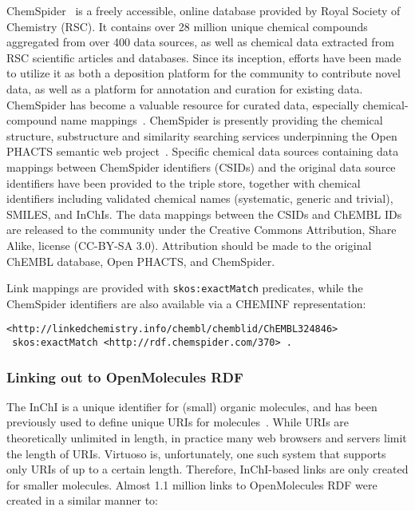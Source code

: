 \documentclass[10pt]{bmc_article}
\newenvironment{bmcformat}{\begin{raggedright}\baselineskip20pt\sloppy\setboolean{publ}{false}}{\end{raggedright}\baselineskip20pt\sloppy}
\begin{document}
\begin{bmcformat}
ChemSpider~\cite{Pence2010} is a freely accessible, online database provided by Royal Society of Chemistry (RSC).
It contains over 28 million unique
chemical compounds aggregated from over 400 data sources, as well as chemical data extracted
from RSC scientific articles and databases. Since its inception, efforts have been made to
utilize it as both a deposition platform for the community to contribute novel data, as
well as a platform for annotation and curation for existing data. ChemSpider has become a
valuable resource for curated data, especially chemical-compound name mappings~\cite{Williams2011}. ChemSpider
is presently providing the chemical structure, substructure and similarity searching services 
underpinning the Open PHACTS semantic web project~\cite{Williams2012}. Specific chemical data 
sources containing data mappings between ChemSpider identifiers (CSIDs) and the original data 
source identifiers have been provided to the triple store, together with chemical identifiers 
including validated chemical names (systematic, generic and trivial), SMILES, and InChIs. 
The data mappings between the CSIDs and ChEMBL IDs are released to the 
community under the Creative Commons Attribution, Share Alike, license (CC-BY-SA 3.0). Attribution 
should be made to the original ChEMBL database, Open PHACTS, and ChemSpider.

Link mappings are provided with \verb+skos:exactMatch+ predicates, while the ChemSpider identifiers
are also available via a CHEMINF representation:
 
\begin{small}
\begin{verbatim}
<http://linkedchemistry.info/chembl/chemblid/ChEMBL324846>
 skos:exactMatch <http://rdf.chemspider.com/370> .
\end{verbatim}
\end{small}

\subsubsection*{Linking out to OpenMolecules RDF}

The InChI is a unique identifier for (small) organic molecules, and has been previously used
to define unique URIs for molecules~\cite{Bradley2009,Willighagen2011}. While URIs are theoretically unlimited in length,
in practice many web browsers and servers limit the length of URIs. Virtuoso is, unfortunately,
one such system that supports only URIs of up to a certain length. Therefore, InChI-based links are only created for smaller molecules. 
Almost 1.1 million links to OpenMolecules RDF were created in a similar manner to:


\end{bmcformat}
\end{document}
